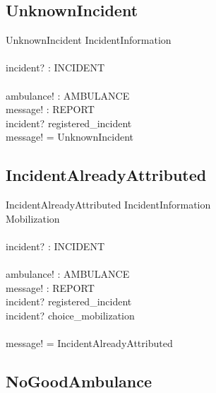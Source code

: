 \documentclass{report}
\begin{document}
\subsection{UnknownIncident}

\begin{schema}{UnknownIncident}
	\Xi IncidentInformation	\\
	\newline				\\
	incident? : INCIDENT	\\
	\newline				\\
	ambulance! : AMBULANCE	\\
	message! : REPORT		\\
  \where  
	incident? \notin registered\_incident \\
	message! = UnknownIncident
\end{schema}

\subsection{IncidentAlreadyAttributed}

\begin{schema}{IncidentAlreadyAttributed}
	\Xi IncidentInformation	\\
	\Xi Mobilization		\\
	\newline				\\
	incident? : INCIDENT	\\
	\newline				\\
	ambulance! : AMBULANCE	\\
	message! : REPORT		\\
  \where
  	incident? \in registered\_incident \\
  	incident? \in \ran choice\_mobilization \\
  	\newline \\
  	message! = IncidentAlreadyAttributed
\end{schema}
\newpage
\subsection{NoGoodAmbulance}
\end{document}
